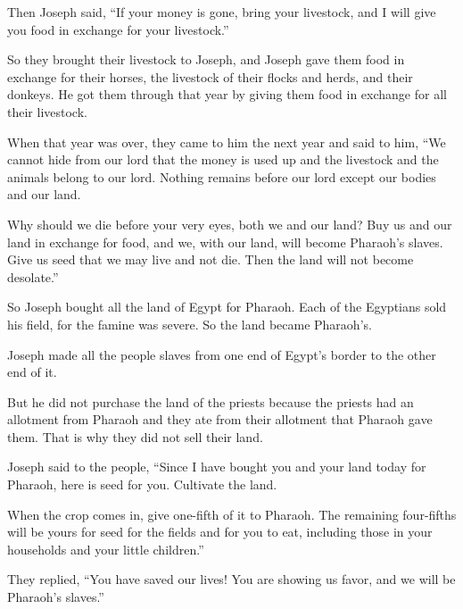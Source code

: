\begin{scripture}
 Then Joseph said, ``If your money is gone, bring your livestock, and I will give you food in exchange for your livestock.''
 So they brought their livestock to Joseph, and Joseph gave them food in exchange for their horses, the livestock of their flocks and herds, and their donkeys. He got them through that year by giving them food in exchange for all their livestock.
\everypar{}

 When that year was over, they came to him the next year and said to him, ``We cannot hide from our lord that the money is used up and the livestock and the animals belong to our lord. Nothing remains before our lord except our bodies and our land.
 Why should we die before your very eyes, both we and our land? Buy us and our land in exchange for food, and we, with our land, will become Pharaoh's slaves. Give us seed that we may live and not die. Then the land will not become desolate.''
\everypar{}

 So Joseph bought all the land of Egypt for Pharaoh. Each of the Egyptians sold his field, for the famine was severe. So the land became Pharaoh's.
 Joseph made all the people slaves from one end of Egypt's border to the other end of it.
 But he did not purchase the land of the priests because the priests had an allotment from Pharaoh and they ate from their allotment that Pharaoh gave them. That is why they did not sell their land.
\everypar{}

 Joseph said to the people, ``Since I have bought you and your land today for Pharaoh, here is seed for you. Cultivate the land.
 When the crop comes in, give one-fifth of it to Pharaoh. The remaining four-fifths will be yours for seed for the fields and for you to eat, including those in your households and your little children.''
 They replied, ``You have saved our lives! You are showing us favor, and we will be Pharaoh's slaves.''
\everypar{}


\end{scripture}
